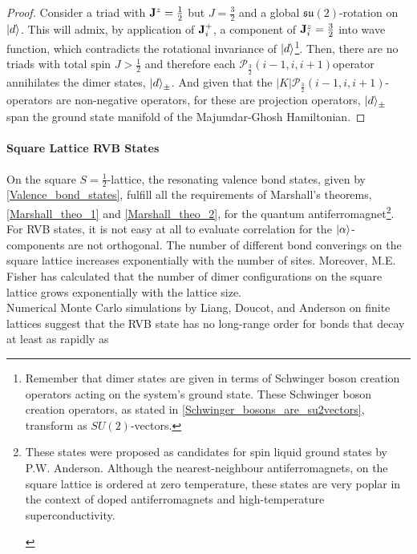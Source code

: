 \documentclass{homework}
\begin{document}
\begin{proof}
Consider a triad with ${\bf J}^z = \frac{1}{2}$ but $J = \frac{3}{2}$ and a global $\mathfrak{s}\mathfrak{u}(2)$-rotation on $\ket{d}$. This will admix, by application of ${\bf J}_i^+$, a component of ${\bf J}_i^z = \frac{3}{2}$ into wave function, which contradicts the rotational invariance of $\ket{d}$\footnote{Remember that dimer states are given in terms of Schwinger boson creation operators acting on the system's ground state. These Schwinger boson creation operators, as stated in \cref{Schwinger_bosons_are_su2vectors}, transform as $SU(2)$-vectors. }. Then, there are no triads with total spin $J > \frac{1}{2}$ and therefore each $\mathcal{P}_{\frac{3}{2}}(i-1,i,i+1)$operator annihilates the dimer states, $\ket{d}_{\pm}$. And given that the $|K|\mathcal{P}_{\frac{3}{2}}(i-1,i,i+1)$-operators are non-negative operators, for these are projection operators, $\ket{d}_{\pm}$ span the ground state manifold of the Majumdar-Ghosh Hamiltonian.

\end{proof}

\paragraph{Square Lattice RVB States}

On the square $S=\frac{1}{2}$-lattice, the resonating valence bond states, given by \cref{Valence_bond_states}, fulfill all the requirements of Marshall's theorems,  \cref{Marshall_theo_1} and \cref{Marshall_theo_2}, for the quantum antiferromagnet\footnote{\begin{tcolorbox}[colback=LimeGreen, title = Historical Context]

These states were proposed as candidates for spin liquid ground states by P.W. Anderson. Although the nearest-neighbour antiferromagnets, on the square lattice is ordered at zero temperature, these states are very poplar in the context of doped antiferromagnets and high-temperature superconductivity. 

\end{tcolorbox}}. For RVB states, it is not easy at all to evaluate correlation for the $\ket{\alpha}$-components are not orthogonal. The number of different bond converings on the square lattice increases exponentially with the number of sites. Moreover, M.E. Fisher has calculated that the number of dimer configurations on the square lattice grows exponentially with the lattice size. \\

Numerical Monte Carlo simulations by Liang, Doucot, and Anderson on finite lattices suggest that the RVB state has no long-range order for bonds that decay at least as rapidly as 
\end{document}
